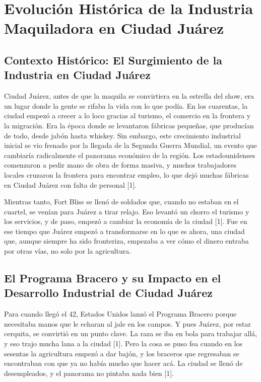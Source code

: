 
\maketitle %

\chapter{Evolución Histórica de la Industria Maquiladora en Ciudad Juárez}

\section{Contexto Histórico: El Surgimiento de la Industria en Ciudad Juárez}

Ciudad Juárez, antes de que la maquila se convirtiera en la estrella del show, era un lugar donde la gente se rifaba la vida con lo que podía. En los cuarentas, la ciudad empezó a crecer a lo loco gracias al turismo, el comercio en la frontera y la migración. Era la época donde se levantaron fábricas pequeñas, que producían de todo, desde jabón hasta whiskey. Sin embargo, este crecimiento industrial inicial se vio frenado por la llegada de la Segunda Guerra Mundial, un evento que cambiaría radicalmente el panorama económico de la región. Los estadounidenses comenzaron a pedir mano de obra de forma masiva, y muchos trabajadores locales cruzaron la frontera para encontrar empleo, lo que dejó muchas fábricas en Ciudad Juárez con falta de personal [1].

Mientras tanto, Fort Bliss se llenó de soldados que, cuando no estaban en el cuartel, se venían para Juárez a tirar relajo. Eso levantó un chorro el turismo y los servicios, y de paso, empezó a cambiar la economía de la ciudad [1]. Fue en ese tiempo que Juárez empezó a transformarse en lo que es ahora, una ciudad que, aunque siempre ha sido fronteriza, empezaba a ver cómo el dinero entraba por otras vías, no solo por la agricultura.

\section{El Programa Bracero y su Impacto en el Desarrollo Industrial de Ciudad Juárez}

Para cuando llegó el 42, Estados Unidos lanzó el Programa Bracero porque necesitaba manos que le echaran al jale en los campos. Y pues Juárez, por estar cerquita, se convirtió en un punto clave. La raza se iba en bola para trabajar allá, y eso trajo mucha lana a la ciudad [1]. Pero la cosa se puso fea cuando en los sesentas la agricultura empezó a dar bajón, y los braceros que regresaban se encontraban con que ya no había mucho que hacer acá. La ciudad se llenó de desempleados, y el panorama no pintaba nada bien [1].

